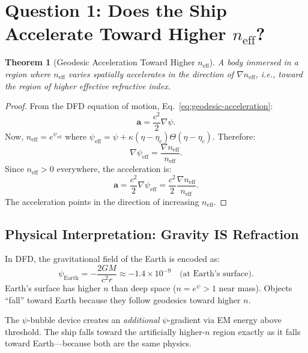 \documentclass[12pt, letterpaper]{article}
\newtheorem{theorem}{Theorem}
\theoremstyle{definition}
\theoremstyle{remark}
\newcommand{\neff}{n_{\mathrm{eff}}}
\newcommand{\avec}{\mathbf{a}}
\newcommand{\etac}{\eta_c}
\begin{document}
\section{Question 1: Does the Ship Accelerate Toward Higher $\neff$?}
\label{sec:Q1}

\begin{theorem}[Geodesic Acceleration Toward Higher $\neff$]
A body immersed in a region where $\neff$ varies spatially accelerates in the
direction of $\nabla \neff$, i.e., toward the region of higher effective
refractive index.
\end{theorem}

\begin{proof}
From the DFD equation of motion, Eq.~\eqref{eq:geodesic-acceleration}:
\begin{equation}
\avec = \frac{c^2}{2} \nabla \psi.
\end{equation}
Now, $\neff = e^{\psi_{\mathrm{eff}}}$ where
$\psi_{\mathrm{eff}} = \psi + \kappa(\eta - \etac)\Theta(\eta - \etac)$.
Therefore:
\begin{equation}
\nabla \psi_{\mathrm{eff}} = \frac{\nabla \neff}{\neff}.
\end{equation}
Since $\neff > 0$ everywhere, the acceleration is:
\begin{equation}
\boxed{
\avec = \frac{c^2}{2} \nabla \psi_{\mathrm{eff}} = \frac{c^2}{2} \frac{\nabla \neff}{\neff}.
}
\label{eq:acceleration-neff}
\end{equation}
The acceleration points in the direction of increasing $\neff$.
\end{proof}

\subsection{Physical Interpretation: Gravity IS Refraction}

In DFD, the gravitational field of the Earth is encoded as:
\begin{equation}
\psi_{\mathrm{Earth}} = -\frac{2GM}{c^2 r} \approx -1.4 \times 10^{-9}
\quad \text{(at Earth's surface)}.
\end{equation}
Earth's surface has higher $n$ than deep space ($n = e^{\psi} > 1$ near mass).
Objects ``fall'' toward Earth because they follow geodesics toward higher $n$.

The $\psi$-bubble device creates an \emph{additional} $\psi$-gradient via
EM energy above threshold. The ship falls toward the artificially higher-$n$
region exactly as it falls toward Earth---because both are the same physics.
\end{document}

